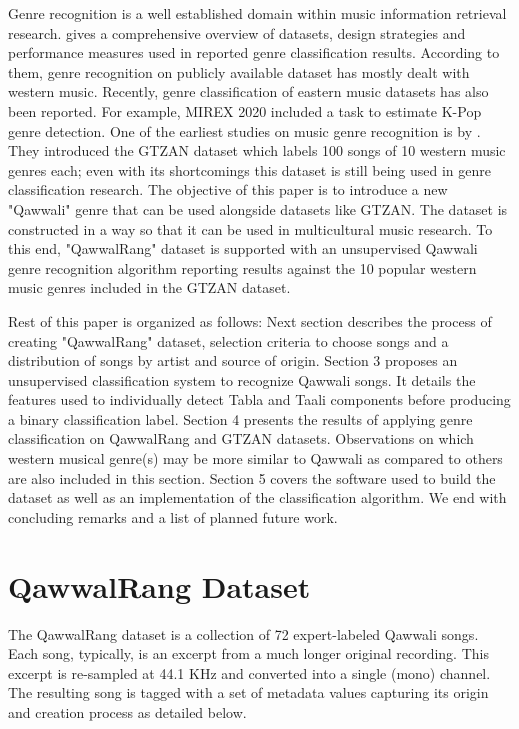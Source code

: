\documentclass{article}
\begin{document}
Genre recognition is a well established domain within music information retrieval research. \cite{music_genre_survey} gives a comprehensive overview of datasets, design strategies and performance measures used in reported genre classification results. According to them, genre recognition on publicly available dataset has mostly dealt with western music. Recently, genre classification of eastern music datasets has also been reported. For example, MIREX 2020 \citep{mirex} included a task to estimate K-Pop genre detection. One of the earliest studies on music genre recognition is by \cite{gtzan}. They introduced the GTZAN dataset which labels 100 songs of 10 western music genres each; even with its shortcomings this dataset is still being used in genre classification research. The objective of this paper is to introduce a new "Qawwali" genre that can be used alongside datasets like GTZAN. The dataset is constructed in a way so that it can be used in multicultural music research. To this end, "QawwalRang" dataset is supported with an unsupervised Qawwali genre recognition algorithm reporting results against the 10 popular western music genres included in the GTZAN dataset.

Rest of this paper is organized as follows: Next section describes the process of creating "QawwalRang" dataset, selection criteria to choose songs and a distribution of songs by artist and source of origin. Section 3 proposes an unsupervised classification system to recognize Qawwali songs. It details the features used to individually detect Tabla and Taali components before producing a binary classification label. Section 4 presents the results of applying genre classification on QawwalRang and GTZAN datasets. Observations on which western musical genre(s) may be more similar to Qawwali as compared to others are also included in this section. Section 5 covers the software used to build the dataset as well as an implementation of the classification algorithm. We end with concluding remarks and a list of planned future work.

\section{QawwalRang Dataset}\label{sec:data}

The QawwalRang dataset is a collection of 72 expert-labeled Qawwali songs. Each song, typically, is an excerpt from a much longer original recording. This excerpt is re-sampled at 44.1 KHz and converted into a single (mono) channel. The resulting song is tagged with a set of metadata values capturing its origin and creation process as detailed below.
\end{document}
